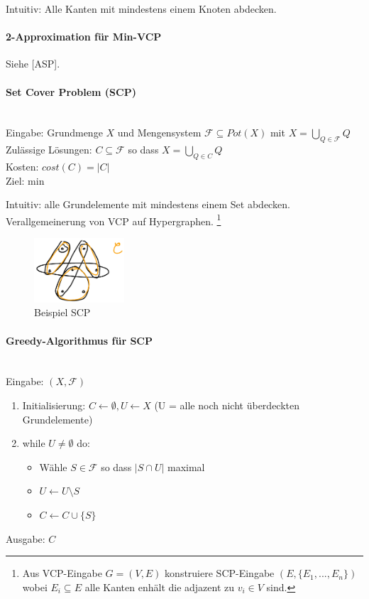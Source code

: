 Intuitiv: Alle Kanten mit mindestens einem Knoten abdecken.

\paragraph{2-Approximation für Min-VCP}
Siehe [ASP].

\paragraph{Set Cover Problem (SCP)} \mbox{} \\
Eingabe: Grundmenge $X$ und Mengensystem $\mathcal{F} \subseteq Pot(X)$ mit $ X = \bigcup_{Q \in \mathcal{F}} Q $ \\
Zulässige Lösungen: $C \subseteq \mathcal{F}$ so dass $ X = \bigcup_{Q \in C} Q $ \\
Kosten: $cost(C) = |C|$ \\
Ziel: min

Intuitiv: alle Grundelemente mit mindestens einem Set abdecken.
Verallgemeinerung von VCP auf Hypergraphen.
\footnote{Aus VCP-Eingabe $G=(V,E)$ konstruiere SCP-Eingabe $(E, \{E_1, ..., E_n\})$
wobei $E_i \subseteq E$ alle Kanten enhält die adjazent zu $v_i \in V$ sind.}

\begin{figure}[h]
    \centering
    \includegraphics[width=0.3\textwidth]{images/set-cover-problem.png}
    \caption{Beispiel SCP}
\end{figure}

\paragraph{Greedy-Algorithmus für SCP} \mbox{} \\
Eingabe: $(X, \mathcal{F})$
\begin{enumerate}
    \item Initialisierung: $C \gets \emptyset, U \gets X$ \qquad (U = alle noch nicht überdeckten Grundelemente)
    \item while $U \neq \emptyset$ do:
    \begin{itemize}
        \item Wähle $S \in \mathcal{F}$ so dass $|S \cap U|$ maximal
        \item $ U \gets U \setminus S $
        \item $ C \gets C \cup \{ S \} $
    \end{itemize}
\end{enumerate}
Ausgabe: $C$

